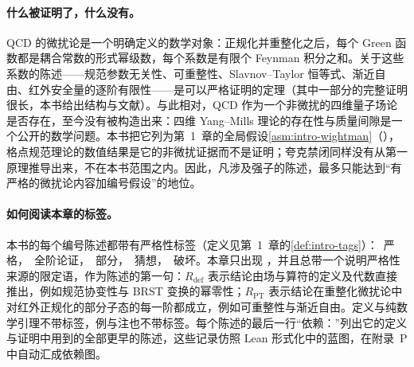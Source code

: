 \paragraph{什么被证明了，什么没有。}QCD 的微扰论是一个明确定义的数学对象：正规化并重整化之后，每个 Green 函数都是耦合常数的形式幂级数，每个系数是有限个 Feynman 积分之和。关于这些系数的陈述——规范参数无关性、可重整性、Slavnov--Taylor 恒等式、渐近自由、红外安全量的逐阶有限性——是可以严格证明的定理（其中一部分的完整证明很长，本书给出结构与文献）。与此相对，QCD 作为一个非微扰的四维量子场论是否存在，至今没有被构造出来：四维 Yang--Mills 理论的存在性与质量间隙是一个公开的数学问题。本书把它列为第~1~章的全局假设\cref{asm:intro-wightman}（\tagC），格点规范理论\cite{Wilson:1974sk}的数值结果是它的非微扰证据而不是证明；夸克禁闭同样没有从第一原理推导出来，不在本书范围之内。因此，凡涉及强子的陈述，最多只能达到“有严格的微扰论内容加编号假设”的地位。

\paragraph{如何阅读本章的标签。}本书的每个编号陈述都带有严格性标签（定义见第~1~章的\cref{def:intro-tags}）：\tagR\ 严格，\tagA\ 全阶论证，\tagP\ 部分，\tagC\ 猜想，\tagV\ 破坏。本章只出现 \tagR，并且总带一个说明严格性来源的限定语，作为陈述的第一句：$R_{\mathrm{def}}$ 表示结论由场与算符的定义及代数直接推出，例如规范协变性与 BRST 变换的幂零性；$R_{\mathrm{PT}}$ 表示结论在重整化微扰论中对红外正规化的部分子态的每一阶都成立，例如可重整性与渐近自由。定义与纯数学引理不带标签，例与注也不带标签。每个陈述的最后一行“依赖：”列出它的定义与证明中用到的全部更早的陈述，这些记录仿照 Lean 形式化中的蓝图，在附录~P 中自动汇成依赖图。


